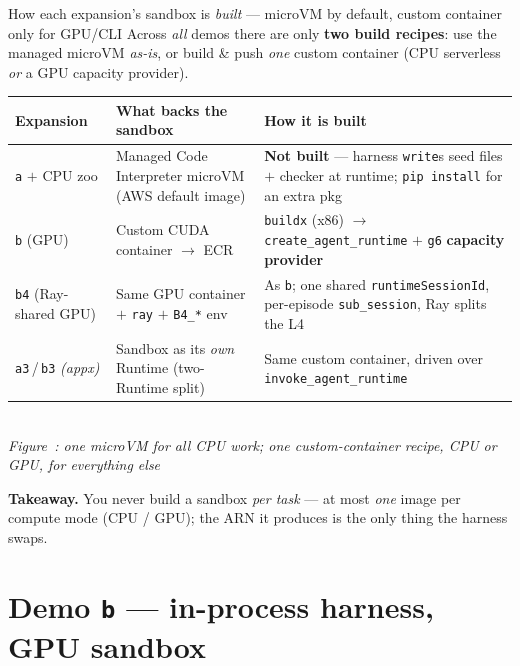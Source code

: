 \documentclass[aspectratio=169]{beamer}
\newcounter{deckfig}
\newcommand{\figtag}[1]{\refstepcounter{deckfig}%
  {\scriptsize\itshape Figure~\thedeckfig: #1}}
\begin{document}
\begin{frame}{How each expansion's sandbox is \emph{built} --- microVM by default, custom container only for GPU/CLI}
  \footnotesize Across \emph{all} demos there are only \textbf{two build recipes}: use the managed
  microVM \emph{as-is}, or build \& push \emph{one} custom container (CPU serverless \emph{or} a GPU
  capacity provider).
  \begin{center}
  \renewcommand{\arraystretch}{0.45}\scriptsize
  \begin{tabular}{@{}p{2.5cm}p{4.0cm}p{5.0cm}@{}}
    \toprule
    \textbf{Expansion} & \textbf{What backs the sandbox} & \textbf{How it is built} \\
    \midrule
    \texttt{a} $+$ CPU zoo & Managed Code Interpreter microVM (AWS default image) & \textbf{Not built} --- harness \texttt{write}s seed files $+$ checker at runtime; \texttt{pip install} for an extra pkg \\
    \texttt{b} (GPU) & Custom CUDA container $\to$ ECR & \texttt{buildx} (x86) $\to$ \texttt{create\_agent\_runtime} $+$ \texttt{g6} \textbf{capacity provider} \\
    \texttt{b4} (Ray-shared GPU) & Same GPU container $+$ \texttt{ray} $+$ \texttt{B4\_*} env & As \texttt{b}; one shared \texttt{runtimeSessionId}, per-episode \texttt{sub\_session}, Ray splits the L4 \\
    \texttt{a3}\,/\,\texttt{b3} \emph{(appx)} & Sandbox as its \emph{own} Runtime (two-Runtime split) & Same custom container, driven over \texttt{invoke\_agent\_runtime} \\
    \bottomrule
  \end{tabular}
  \\[0.1em]\figtag{one microVM for all CPU work; one custom-container recipe, CPU or GPU, for everything else}
  \end{center}
  \vspace{-0.3em}
  {\scriptsize\textbf{Takeaway.} You never build a sandbox \emph{per task} --- at most \emph{one} image
  per compute mode (CPU / GPU); the ARN it produces is the only thing the harness swaps.}
\end{frame}

\section{Demo \texttt{b} --- in-process harness, GPU sandbox}
\end{document}
